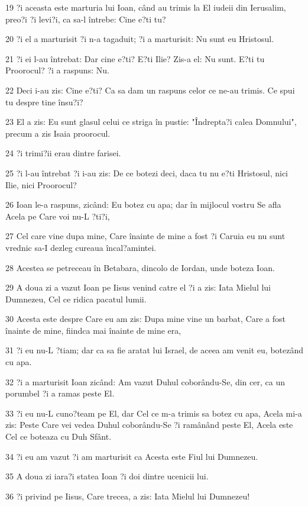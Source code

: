 \par 19 ?i aceasta este marturia lui Ioan, când au trimis la El iudeii din Ierusalim, preo?i ?i levi?i, ca sa-l întrebe: Cine e?ti tu?
\par 20 ?i el a marturisit ?i n-a tagaduit; ?i a marturisit: Nu sunt eu Hristosul.
\par 21 ?i ei l-au întrebat: Dar cine e?ti? E?ti Ilie? Zis-a el: Nu sunt. E?ti tu Proorocul? ?i a raspuns: Nu.
\par 22 Deci i-au zis: Cine e?ti? Ca sa dam un raspuns celor ce ne-au trimis. Ce spui tu despre tine însu?i?
\par 23 El a zis: Eu sunt glasul celui ce striga în pustie: "Îndrepta?i calea Domnului", precum a zis Isaia proorocul.
\par 24 ?i trimi?ii erau dintre farisei.
\par 25 ?i l-au întrebat ?i i-au zis: De ce botezi deci, daca tu nu e?ti Hristosul, nici Ilie, nici Proorocul?
\par 26 Ioan le-a raspuns, zicând: Eu botez cu apa; dar în mijlocul vostru Se afla Acela pe Care voi nu-L ?ti?i,
\par 27 Cel care vine dupa mine, Care înainte de mine a fost ?i Caruia eu nu sunt vrednic sa-I dezleg cureaua încal?amintei.
\par 28 Acestea se petreceau în Betabara, dincolo de Iordan, unde boteza Ioan.
\par 29 A doua zi a vazut Ioan pe Iisus venind catre el ?i a zis: Iata Mielul lui Dumnezeu, Cel ce ridica pacatul lumii.
\par 30 Acesta este despre Care eu am zis: Dupa mine vine un barbat, Care a fost înainte de mine, fiindca mai înainte de mine era,
\par 31 ?i eu nu-L ?tiam; dar ca sa fie aratat lui Israel, de aceea am venit eu, botezând cu apa.
\par 32 ?i a marturisit Ioan zicând: Am vazut Duhul coborându-Se, din cer, ca un porumbel ?i a ramas peste El.
\par 33 ?i eu nu-L cuno?team pe El, dar Cel ce m-a trimis sa botez cu apa, Acela mi-a zis: Peste Care vei vedea Duhul coborându-Se ?i ramânând peste El, Acela este Cel ce boteaza cu Duh Sfânt.
\par 34 ?i eu am vazut ?i am marturisit ca Acesta este Fiul lui Dumnezeu.
\par 35 A doua zi iara?i statea Ioan ?i doi dintre ucenicii lui.
\par 36 ?i privind pe Iisus, Care trecea, a zis: Iata Mielul lui Dumnezeu!
